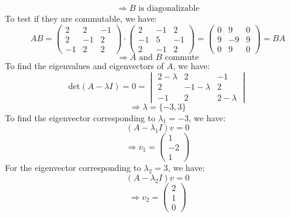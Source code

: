 \documentclass{article}
\begin{document}
\[\Rightarrow B \text{ is diagonalizable}\]
To test if they are commutable, we have:
\begin{equation*}
    AB = 
    \begin{pmatrix}
        2 & 2 & -1 \\
        2 & -1 & 2 \\
        -1 & 2 & 2 
    \end{pmatrix}
    \cdot
    \begin{pmatrix}
        2 & -1 & 2 \\
        -1 & 5 & -1 \\
        2 & -1 & 2
    \end{pmatrix}
    = 
    \begin{pmatrix}
        0 & 9 & 0 \\
        9 & -9 & 9 \\
        0 & 9 & 0
    \end{pmatrix}
    =
    BA
\end{equation*}
\[\Rightarrow A \text{ and } B \text{ commute}\]
To find the eigenvalues and eigenvectors of \(A\), we have:
\begin{equation*}
    \text{det}(A - \lambda I) = 0 =
    \begin{vmatrix}
        2 - \lambda & 2 & -1 \\
        2 & -1 - \lambda & 2 \\
        -1 & 2 & 2 - \lambda
    \end{vmatrix}
\end{equation*}
\[\Rightarrow \lambda = \{-3, 3\}\]
To find the eigenvector corresponding to \(\lambda_1 = -3\), we have:
    \[(A - \lambda_1 I) v = 0\]
    \[\Rightarrow v_1 = 
    \begin{pmatrix}
        1 \\
        -2 \\
        1
    \end{pmatrix}
    \]
For the eigenvector corresponding to \(\lambda_2 = 3\), we have:
    \[(A - \lambda_2 I) v = 0\]
    \[\Rightarrow v_2 =
    \begin{pmatrix}
        2 \\
        1 \\
        0
    \end{pmatrix}
    \]
\end{document}
